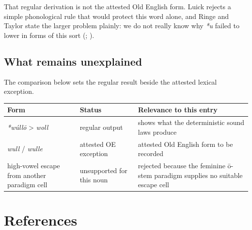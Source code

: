 \documentclass[
  british,
  a4paper,
  openany]{book}
\newcounter{none} %
\begin{document}
That regular derivation is not the attested Old English form. Luick
rejects a simple phonological rule that would protect this word alone,
and Ringe and Taylor state the larger problem plainly: we do not really
know why \emph{*u} failed to lower in forms of this sort
(;
).

\subsection{What remains unexplained}\label{what-remains-unexplained}

The comparison below sets the regular result beside the attested lexical
exception.

{\def\LTcaptype{none} %
\begin{longtable}[]{@{}
  >{\raggedright\arraybackslash}p{}
  >{\raggedright\arraybackslash}p{}
  >{\raggedright\arraybackslash}p{}@{}}
\toprule\noalign{}
\begin{minipage}[b]{\linewidth}\raggedright
Form
\end{minipage} & \begin{minipage}[b]{\linewidth}\raggedright
Status
\end{minipage} & \begin{minipage}[b]{\linewidth}\raggedright
Relevance to this entry
\end{minipage} \\
\midrule\noalign{}
\endhead
\bottomrule\noalign{}
\endlastfoot
\emph{*wúllō} \textgreater{} \emph{woll} & regular output & shows what
the deterministic sound laws produce \\
\emph{wull} / \emph{wulle} & attested OE exception & attested Old
English form to be recorded \\
high-vowel escape from another paradigm cell & unsupported for this noun
& rejected because the feminine ō-stem paradigm supplies no suitable
escape cell \\
\end{longtable}
}

\clearpage

\section{References}\label{references}
\end{document}
